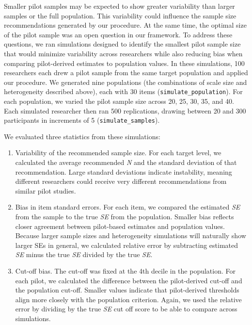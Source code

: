 \documentclass[
  man]{apa7}
\providecommand{\tightlist}{%
  \setlength{\itemsep}{0pt}\setlength{\parskip}{0pt}}
\begin{document}
Smaller pilot samples may be expected to show greater variability than larger samples or the full population. This variability could influence the sample size recommendations generated by our procedure. At the same time, the optimal size of the pilot sample was an open question in our framework. To address these questions, we ran simulations designed to identify the smallest pilot sample size that would minimize variability across researchers while also reducing bias when comparing pilot-derived estimates to population values. In these simulations, 100 researchers each drew a pilot sample from the same target population and applied our procedure. We generated nine populations (the combinations of scale size and heterogeneity described above), each with 30 items (\texttt{simulate\_population}). For each population, we varied the pilot sample size across 20, 25, 30, 35, and 40. Each simulated researcher then ran 500 replications, drawing between 20 and 300 participants in increments of 5 (\texttt{simulate\_samples}).

We evaluated three statistics from these simulations:

\begin{enumerate}
\def\labelenumi{\arabic{enumi}.}
\tightlist
\item
  Variability of the recommended sample size. For each target level, we calculated the average recommended \emph{N} and the standard deviation of that recommendation. Large standard deviations indicate instability, meaning different researchers could receive very different recommendations from similar pilot studies.
\item
  Bias in item standard errors. For each item, we compared the estimated \emph{SE} from the sample to the true \emph{SE} from the population. Smaller bias reflects closer agreement between pilot-based estimates and population values. Because larger sample sizes and heterogeneity simulations will naturally show larger SEs in general, we calculated relative error by subtracting estimated \emph{SE} minus the true \emph{SE} divided by the true \emph{SE}.
\item
  Cut-off bias. The cut-off was fixed at the 4th decile in the population. For each pilot, we calculated the difference between the pilot-derived cut-off and the population cut-off. Smaller values indicate that pilot-derived thresholds align more closely with the population criterion. Again, we used the relative error by dividing by the true \emph{SE} cut off score to be able to compare across simulations.
\end{enumerate}
\end{document}
